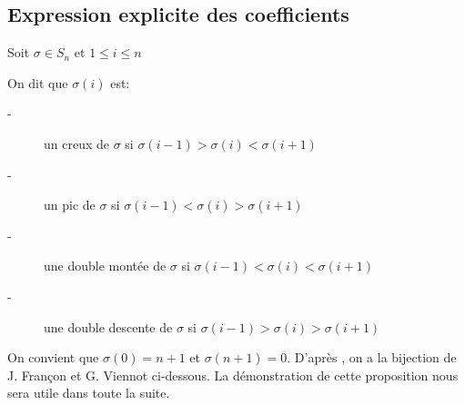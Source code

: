 \subsection{Expression explicite des coefficients} %
Soit $\sigma \in S_{n}$ et $1 \leq i \leq n$\\
\begin{definition}
	\begin{rm}
		On dit que $\sigma(i)$ est:
		\begin{description}
			\item[-] un creux de $\sigma$ si $\sigma (i-1)> \sigma (i)<\sigma (i+1)$
			\item[-] un pic de $\sigma$ si  $\sigma (i-1)<\sigma (i)>\sigma(i+1)$
			\item[-] une double montée de $\sigma$ si $\sigma (i-1)<\sigma (i)<\sigma(i+1)$
			\item[-] une double descente de $\sigma$ si  $\sigma (i-1)>\sigma (i)>\sigma(i+1)$
		\end{description}
	\end{rm}
\end{definition}
On convient que $\sigma (0) = n+1$ et $\sigma (n+1) = 0 $.
D'après \cite{FranconViennot}, on a la bijection de\\ J. Françon et G. Viennot ci-dessous. La démonstration
de cette proposition nous sera utile dans toute la suite.

